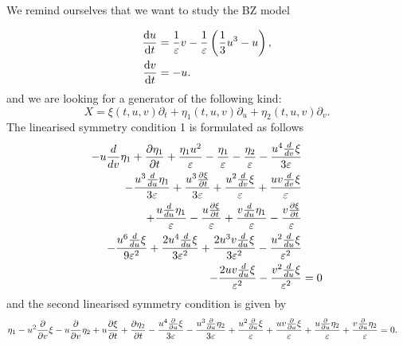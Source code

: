 We remind ourselves that we want to study the BZ model

\begin{equation*}
  \begin{split}
    \dv{u}{t}&=\dfrac{1}{\varepsilon}v-\dfrac{1}{\varepsilon}\left(\dfrac{1}{3}u^3-u\right),\\
    \dv{v}{t}&=-u.\\    
    \end{split}
\end{equation*}
and we are looking for a generator of the following kind:
\begin{equation}
X=\xi(t,u,v)\partial_t+\eta_1(t,u,v)\partial_u+\eta_2(t,u,v)\partial_v.
\end{equation}
The linearised symmetry condition 1 is formulated as follows
\begin{align}
  - u \frac{d}{d v} \eta_1 + \pdv{\eta_1}{t} + \frac{\eta_1 u^{2}}{\varepsilon} - \frac{\eta_1}{\varepsilon} - \frac{\eta_2}{\varepsilon} - \frac{u^{4} \frac{d}{d v} \xi}{3 \varepsilon}&\nonumber\\
  - \frac{u^{3} \frac{d}{d u} \eta_1}{3 \varepsilon} + \frac{u^{3} \pdv{\xi}{t}}{3 \varepsilon} + \frac{u^{2} \frac{d}{d v} \xi}{\varepsilon} + \frac{u v \frac{d}{d v} \xi}{\varepsilon}&\nonumber\\
  + \frac{u \frac{d}{d u} \eta_1}{\varepsilon} - \frac{u \pdv{\xi}{t}}{\varepsilon} + \frac{v \frac{d}{d u} \eta_1}{\varepsilon} - \frac{v\pdv{\xi}{t}}{\varepsilon}&\nonumber\\
  - \frac{u^{6} \frac{d}{d u} \xi}{9 \varepsilon^{2}} + \frac{2 u^{4} \frac{d}{d u} \xi}{3 \varepsilon^{2}} + \frac{2 u^{3} v \frac{d}{d u} \xi}{3 \varepsilon^{2}} - \frac{u^{2} \frac{d}{d u} \xi}{\varepsilon^{2}}&\nonumber\\
  - \frac{2 u v \frac{d}{d u} \xi}{\varepsilon^{2}} - \frac{v^{2} \frac{d}{d u} \xi}{\varepsilon^{2}}&=0\label{eq:BZ_lin_sym_1}
\end{align}
and the second linearised symmetry condition is given by
\begin{align}
\eta_1 - u^{2} \pdv{}{v} \xi - u \pdv{}{v} \eta_2 + u \pdv{\xi}{t} + \pdv{\eta_2}{t} - \frac{u^{4} \pdv{}{u} \xi}{3 \varepsilon} - \frac{u^{3} \pdv{}{u} \eta_2}{3 \varepsilon} + \frac{u^{2} \pdv{}{u} \xi}{\varepsilon} + \frac{u v \pdv{}{u} \xi}{\varepsilon} + \frac{u \pdv{}{u} \eta_2}{\varepsilon} + \frac{v \pdv{}{u} \eta_2}{\varepsilon}&=0.\label{eq:BZ_lin_sym_1}
\end{align}



